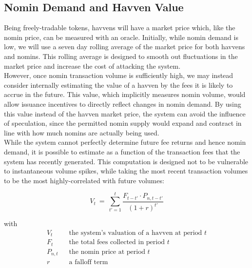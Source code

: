 \subsection{Nomin Demand and Havven Value}

\noindent Being freely-tradable tokens, havvens will have a market
price which, like the nomin price, can be measured with an oracle. Initially,
while nomin demand is low, we will use a seven day rolling average of the
market price for both havvens and nomins. This rolling average is designed to
smooth out fluctuations in the market price and increase the cost of
attacking the system.\\

\noindent However, once nomin transaction volume is sufficiently high, we may
instead consider internally estimating the value of a havven by the fees it
is likely to accrue in the future. This value, which implicitly measures
nomin volume, would allow issuance incentives to directly reflect changes in
nomin demand. By using this value instead of the havven market price, the
system can avoid the influence of speculation, since the permitted nomin
supply would expand and contract in line with how much nomins are actually
being used. \\

\noindent While the system cannot perfectly determine future fee returns and
hence nomin demand, it is possible to estimate as a function of the
transaction fees that the system has recently generated. This computation is
designed not to be vulnerable to instantaneous volume spikes, while taking
the most recent transaction volumes to be the most highly-correlated with
future volumes:
\vspace{3mm}

\begin{equation}
    V_{t} \ = \ \sum_{t'=1}^{t} \frac{F_{t - t'} \cdot P_{n,t - t'}}{{(1 + r)}^{t'}} \label{eq:price}
\end{equation}

with
\begin{align*} 
V_{t} \ \ & \text{ the system's valuation of a havven at period } t  \\
F_t \ \ & \text{ the total fees collected in period } t\\
P_{n,t} \ \ & \text{ the nomin price at period } t\\
r \ \ & \text{ a falloff term}  \\
\end{align*}

